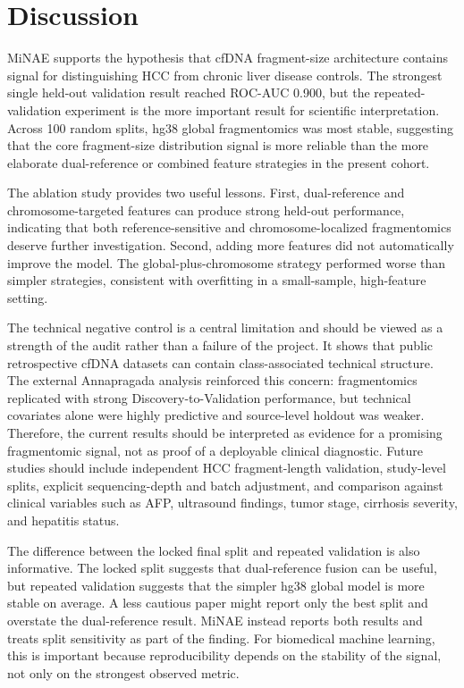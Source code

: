 \documentclass[conference]{IEEEtran}
\begin{document}
\section{Discussion}
MiNAE supports the hypothesis that cfDNA fragment-size architecture contains signal for distinguishing HCC from chronic liver disease controls. The strongest single held-out validation result reached ROC-AUC 0.900, but the repeated-validation experiment is the more important result for scientific interpretation. Across 100 random splits, hg38 global fragmentomics was most stable, suggesting that the core fragment-size distribution signal is more reliable than the more elaborate dual-reference or combined feature strategies in the present cohort.

The ablation study provides two useful lessons. First, dual-reference and chromosome-targeted features can produce strong held-out performance, indicating that both reference-sensitive and chromosome-localized fragmentomics deserve further investigation. Second, adding more features did not automatically improve the model. The global-plus-chromosome strategy performed worse than simpler strategies, consistent with overfitting in a small-sample, high-feature setting.

The technical negative control is a central limitation and should be viewed as a strength of the audit rather than a failure of the project. It shows that public retrospective cfDNA datasets can contain class-associated technical structure. The external Annapragada analysis reinforced this concern: fragmentomics replicated with strong Discovery-to-Validation performance, but technical covariates alone were highly predictive and source-level holdout was weaker. Therefore, the current results should be interpreted as evidence for a promising fragmentomic signal, not as proof of a deployable clinical diagnostic. Future studies should include independent HCC fragment-length validation, study-level splits, explicit sequencing-depth and batch adjustment, and comparison against clinical variables such as AFP, ultrasound findings, tumor stage, cirrhosis severity, and hepatitis status.

The difference between the locked final split and repeated validation is also informative. The locked split suggests that dual-reference fusion can be useful, but repeated validation suggests that the simpler hg38 global model is more stable on average. A less cautious paper might report only the best split and overstate the dual-reference result. MiNAE instead reports both results and treats split sensitivity as part of the finding. For biomedical machine learning, this is important because reproducibility depends on the stability of the signal, not only on the strongest observed metric.
\end{document}
